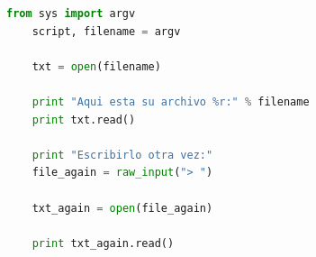 \documentclass[]{beamer}
\begin{document}
\begin{frame}[fragile]
	\begin{lstlisting}[language=Python, 
	basicstyle=\ttfamily\small, 
	keywordstyle=\color{keywords},
	commentstyle=\color{comments},
	stringstyle=\color{red},
	showstringspaces=false,
	identifierstyle=\color{green},caption= leer un archivo, basicstyle=\tiny]
	from sys import argv
	script, filename = argv
	
	txt = open(filename)
	
	print "Aqui esta su archivo %r:" % filename
	print txt.read()
	
	print "Escribirlo otra vez:"
	file_again = raw_input("> ")
	
	txt_again = open(file_again)
	
	print txt_again.read()
	
	
	\end{lstlisting}
\end{frame}
\end{document}
